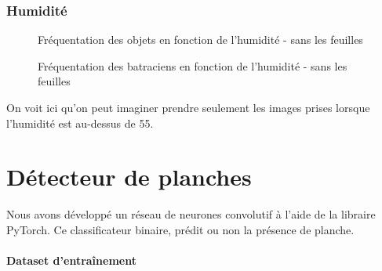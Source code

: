 \subsubsection{Humidité}

\begin{figure}[H]
    \centering
    \caption{Fréquentation des objets en fonction de l'humidité - sans les feuilles}
    \label{fig:Fréquentation des objets en fonction de l'humidité - sans les feuilles}
\end{figure}

\begin{figure}[H]
    \centering
    \caption{Fréquentation des batraciens en fonction de l'humidité - sans les feuilles}
    \label{fig:Fréquentation des batraciens en fonction de l'humidité - sans les feuilles}
\end{figure}

On voit ici qu'on peut imaginer prendre seulement les images prises lorsque l'humidité est au-dessus de 55.


\section{Détecteur de planches}\label{sex:Planche}

Nous avons développé un réseau de neurones convolutif à l'aide de la libraire PyTorch. Ce classificateur binaire, prédit ou non la présence de planche.

\paragraph*{Dataset d'entraînement}

